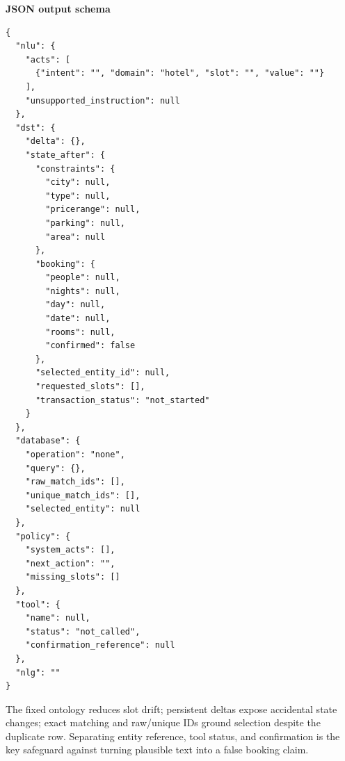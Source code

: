 \documentclass[11pt]{article}
\begin{document}
\newpage
\noindent\textbf{JSON output schema}\par\smallskip
\begin{lstlisting}[style=prompt]
{
  "nlu": {
    "acts": [
      {"intent": "", "domain": "hotel", "slot": "", "value": ""}
    ],
    "unsupported_instruction": null
  },
  "dst": {
    "delta": {},
    "state_after": {
      "constraints": {
        "city": null,
        "type": null,
        "pricerange": null,
        "parking": null,
        "area": null
      },
      "booking": {
        "people": null,
        "nights": null,
        "day": null,
        "date": null,
        "rooms": null,
        "confirmed": false
      },
      "selected_entity_id": null,
      "requested_slots": [],
      "transaction_status": "not_started"
    }
  },
  "database": {
    "operation": "none",
    "query": {},
    "raw_match_ids": [],
    "unique_match_ids": [],
    "selected_entity": null
  },
  "policy": {
    "system_acts": [],
    "next_action": "",
    "missing_slots": []
  },
  "tool": {
    "name": null,
    "status": "not_called",
    "confirmation_reference": null
  },
  "nlg": ""
}
\end{lstlisting}

The fixed ontology reduces slot drift; persistent deltas expose accidental
state changes; exact matching and raw/unique IDs ground selection despite the
duplicate row. Separating entity reference, tool status, and confirmation is
the key safeguard against turning plausible text into a false booking claim.
\end{document}
